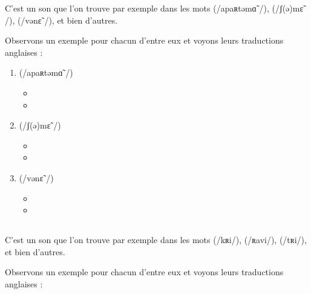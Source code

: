 C'est un son que l'on trouve par exemple dans les mots
 (/apaʀtəmɑ̃ /),  (/ʃ(ə)mɛ̃ /),  (/vənɛ̃ /), et bien d'autres.

Observons un exemple pour chacun d'entre eux et voyons leurs
traductions anglaises :\par

\begin{enumerate}
\item {} (/apaʀtəmɑ̃ /)
  \begin{itemize}
  \item {}
    \item {}
    \end{itemize}
    
\item {} (/ʃ(ə)mɛ̃ /)
  \begin{itemize}
  \item {}
  \item {}
  \end{itemize}

  
\item {} (/vənɛ̃ /)
  \begin{itemize}
  \item {}
  \item {}
  \end{itemize}
   
\end{enumerate}

\subsection{}\label{subsec:ifr}

C'est un son que l'on trouve par exemple dans les mots
 (/kʀi/),  (/ʀavi/),  (/tʀi/), et bien d'autres.

Observons un exemple pour chacun d'entre eux et voyons leurs
traductions anglaises :\par

